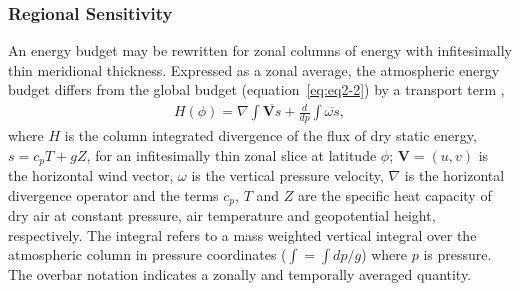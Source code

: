 \subsubsection{Regional Sensitivity}
An energy budget may be rewritten for zonal columns of energy with infitesimally thin meridional thickness. Expressed as a zonal average, the atmospheric energy budget differs from the global budget (equation~\ref{eq:eq2-2}) by a transport term \citep{PO1992}, 
\begin{eqnarray}
H(\phi) = \nabla \int \overline{\mathbf{V} s} + \frac{d}{dp} \int \overline{\omega s}, \label{eq:eq2-3}
\end{eqnarray}
where $H$ is the column integrated divergence of the flux of dry static energy, $s = c_p T + g Z$, for an infitesimally thin zonal slice at latitude $\phi$; $\mathbf{V} = (u,v)$  is the horizontal wind vector, $\omega$ is the vertical pressure velocity, $\nabla$ is the horizontal divergence operator and the terms $c_p$, $T$ and $Z$ are the specific heat capacity of dry air at constant pressure, air temperature and geopotential height, respectively. The integral refers to a mass weighted vertical integral over the atmospheric column in pressure coordinates ($\int = \int dp/g$) where $p$ is pressure. The overbar notation indicates a zonally and temporally averaged quantity.

